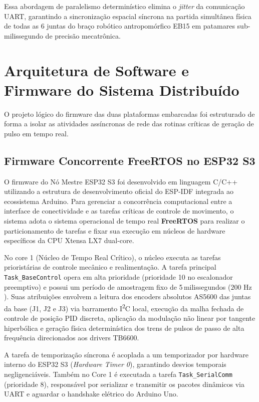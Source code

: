Essa abordagem de paralelismo determinístico elimina o \textit{jitter} da comunicação UART, garantindo a sincronização espacial síncrona na partida simultânea física de todas as 6 juntas do braço robótico antropomórfico EB15 em patamares sub-milissegundo de precisão mecatrônica.

\section{Arquitetura de Software e Firmware do Sistema Distribuído}
\label{sec:algoritmo_controle}

O projeto lógico do firmware das duas plataformas embarcadas foi estruturado de forma a isolar as atividades assíncronas de rede das rotinas críticas de geração de pulso em tempo real.

\subsection{Firmware Concorrente FreeRTOS no ESP32 S3}
\label{subsec:rtos_mestre}

O firmware do Nó Mestre ESP32 S3 foi desenvolvido em linguagem C/C++ utilizando a estrutura de desenvolvimento oficial do ESP-IDF integrada ao ecossistema Arduino. Para gerenciar a concorrência computacional entre a interface de conectividade e as tarefas críticas de controle de movimento, o sistema adota o sistema operacional de tempo real \textbf{FreeRTOS} para realizar o particionamento de tarefas e fixar sua execução em núcleos de hardware específicos da CPU Xtensa LX7 dual-core.

No core 1 (Núcleo de Tempo Real Crítico), o núcleo executa as tarefas prioristárias de controle mecânico e realimentação. A tarefa principal \texttt{Task\_BaseControl} opera em alta prioridade (prioridade 10 no escalonador preemptivo) e possui um período de amostragem fixo de 5\,milissegundos ($200\text{ Hz}$). Suas atribuições envolvem a leitura dos encoders absolutos AS5600 das juntas da base (J1, J2 e J3) via barramento I\textsuperscript{2}C local, execução da malha fechada de controle de posição PID discreta, aplicação da modulação não linear por tangente hiperbólica e geração física determinística dos trens de pulsos de passo de alta frequência direcionados aos drivers TB6600.
    
A tarefa de temporização síncrona é acoplada a um temporizador por hardware interno do ESP32 S3 (\textit{Hardware Timer 0}), garantindo desvios temporais negligenciáveis. Também no Core 1 é executada a tarefa \texttt{Task\_SerialComm} (prioridade 8), responsável por serializar e transmitir os pacotes dinâmicos via UART e aguardar o handshake elétrico do Arduino Uno.
    
